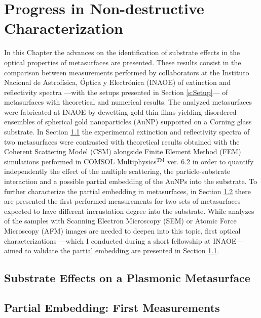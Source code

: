 \documentclass[11pt]{Latex/Classes/PhDthesisPSnPDF}
\begin{document}
\chapter{Progress in Non-destructive Characterization}
	\label{ch:Non-int}
%
	In this Chapter the advances on the identification of substrate effects in the optical properties of metasurfaces are presented. These results consist in the comparison between measurements performed by collaborators at the Instituto Nacional de Astrofísica, Óptica y Electrónica (INAOE) of extinction and reflectivity spectra ---with the setups presented  in Section \ref{s:Setup}--- of metasurfaces  with theoretical and numerical results. The analyzed metasurfaces were fabricated at INAOE  by dewetting gold thin films yielding disordered ensembles of spherical gold nanoparticles (AuNP) supported on a Corning glass substrate. In Section \ref{s:substratep} the  experimental extinction and reflectivity spectra of two metasurfaces were contrasted  with theoretical results obtained with the Coherent Scattering Model (CSM) alongside Finite Element Method (FEM) simulations performed in  COMSOL Multiphysics$^\text{TM}$ ver. 6.2 in order to quantify independently the effect of the multiple scattering,  the particle-substrate interaction and a possible partial embedding of the AuNPs into the substrate. To further characterize the partial embedding in metasurfaces, in Section \ref{s:pembedding} there are presented the first performed measurements for two sets of metasurfaces expected to have different incrustation degree into the substrate. While analyzes of the samples with Scanning Electron Microscopy (SEM) or Atomic Force Microscopy (AFM) images are needed to deepen into this topic, first optical characterizations ---which I conducted during a short fellowship at INAOE--- aimed to validate the partial embedding are presented in Section \ref{s:substratep}.	
	
	\section{Substrate Effects on a Plasmonic Metasurface}
		\label{s:substratep}
		
		
	\section{Partial Embedding: First Measurements}
		\label{s:pembedding}
		
	
\end{document}
